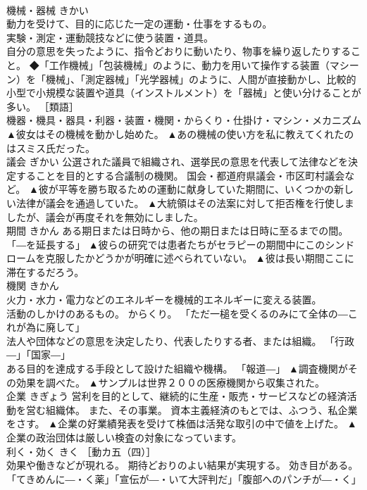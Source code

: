 \documentclass[8pt]{extreport}
\begin{document}
\begin{CJK}{UTF8}{min}
\\	機械・器械	きかい	
\\	動力を受けて、目的に応じた一定の運動・仕事をするもの。 
\\	実験・測定・運動競技などに使う装置・道具。 
\\	自分の意思を失ったように、指令どおりに動いたり、物事を繰り返したりすること。 ◆「工作機械」「包装機械」のように、動力を用いて操作する装置（マシーン）を「機械」、「測定器械」「光学器械」のように、人間が直接動かし、比較的小型で小規模な装置や道具（インストルメント）を「器械」と使い分けることが多い。 ［類語］
\\	機器・機具・器具・利器・装置・機関・からくり・仕掛け・マシン・メカニズム	▲彼女はその機械を動かし始めた。 ▲あの機械の使い方を私に教えてくれたのはスミス氏だった。
\\	議会	ぎかい	公選された議員で組織され、選挙民の意思を代表して法律などを決定することを目的とする合議制の機関。 国会・都道府県議会・市区町村議会など。	▲彼が平等を勝ち取るための運動に献身していた期間に、いくつかの新しい法律が議会を通過していた。 ▲大統領はその法案に対して拒否権を行使しましたが、議会が再度それを無効にしました。
\\	期間	きかん	ある期日または日時から、他の期日または日時に至るまでの間。 「―を延長する」	▲彼らの研究では患者たちがセラピーの期間中にこのシンドロームを克服したかどうかが明確に述べられていない。 ▲彼は長い期間ここに滞在するだろう。
\\	機関	きかん	
\\	火力・水力・電力などのエネルギーを機械的エネルギーに変える装置。 
\\	活動のしかけのあるもの。 からくり。 「ただ一槌を受くるのみにて全体の―これが為に廃して」 
\\	法人や団体などの意思を決定したり、代表したりする者、または組織。 「行政―」「国家―」 
\\	ある目的を達成する手段として設けた組織や機構。 「報道―」	▲調査機関がその効果を調べた。 ▲サンプルは世界２００の医療機関から収集された。
\\	企業	きぎょう	営利を目的として、継続的に生産・販売・サービスなどの経済活動を営む組織体。 また、その事業。 資本主義経済のもとでは、ふつう、私企業をさす。	▲企業の好業績発表を受けて株価は活発な取引の中で値を上げた。 ▲企業の政治団体は厳しい検査の対象になっています。
\\	利く・効く	きく	［動カ五（四）］ 
\\	効果や働きなどが現れる。 期待どおりのよい結果が実現する。 効き目がある。 「てきめんに―・く薬」「宣伝が―・いて大評判だ」「腹部へのパンチが―・く」 

\end{CJK}
\end{document}
